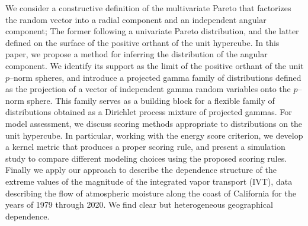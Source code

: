 

We consider a constructive definition of the multivariate Pareto that factorizes the 
random vector into a radial component and an independent angular component; The former
following a univariate Pareto distribution, and the latter defined on the surface of the 
positive orthant of the unit hypercube.  In this paper, we  propose a method for
inferring the distribution of the angular component.  We identify its support 
as the limit of the positive orthant of the unit $p$--norm spheres,
and introduce a projected gamma family of
distributions defined as the projection of a vector of independent gamma random variables
onto the $p$--norm sphere.  This family serves as a building block for a flexible family
of distributions obtained as a Dirichlet process mixture of projected gammas.  For 
model assessment, we discuss scoring methods appropriate 
to distributions on the unit hypercube.  In particular, working with the energy score
criterion, we develop a kernel metric that produces a 
proper scoring rule, and present a simulation study to compare 
different modeling choices using the proposed scoring rules.  Finally we apply our 
approach to describe the dependence structure of the extreme values of the magnitude 
of the integrated vapor transport (IVT), data describing the flow 
of atmospheric moisture along the coast of California for the years of 1979 
through 2020.  We find clear but heterogeneous geographical dependence.

